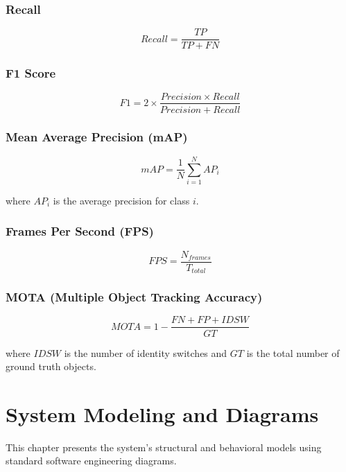 \documentclass[12pt,a4paper]{report}
\begin{document}
\subsection{Recall}
\begin{equation}
Recall = \frac{TP}{TP + FN}
\end{equation}

\subsection{F1 Score}
\begin{equation}
F1 = 2 \times \frac{Precision \times Recall}{Precision + Recall}
\end{equation}

\subsection{Mean Average Precision (mAP)}
\begin{equation}
mAP = \frac{1}{N} \sum_{i=1}^{N} AP_i
\end{equation}

where $AP_i$ is the average precision for class $i$.

\subsection{Frames Per Second (FPS)}
\begin{equation}
FPS = \frac{N_{frames}}{T_{total}}
\end{equation}

\subsection{MOTA (Multiple Object Tracking Accuracy)}
\begin{equation}
MOTA = 1 - \frac{FN + FP + IDSW}{GT}
\end{equation}

where $IDSW$ is the number of identity switches and $GT$ is the total number of ground truth objects.


\chapter{System Modeling and Diagrams}

This chapter presents the system's structural and behavioral models using standard software engineering diagrams.
\end{document}
